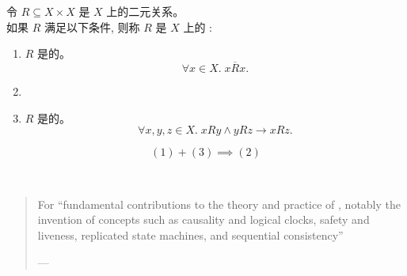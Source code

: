 \begin{frame}{}
  \begin{definition}
    令 $R \subseteq X \times X$ 是 $X$ 上的二元关系。\\[3pt]
    如果 $R$ 满足以下条件, 则称 $R$ 是 $X$ 上的 : \\[6pt]
    \begin{enumerate}[(1)]
      \setlength{\itemsep}{6pt}
      \item $R$ 是的。
        \[
          \forall x \in X.\; x \overline{R} x.
        \]
      \item {}
      \item $R$ 是的。
        \[
          \forall x, y, z \in X.\; x R y \land y R z \to x R z.
        \]
    \end{enumerate}
  \end{definition}

  \pause
  \vspace{-0.20cm}
  \[
    (1) + (3) \implies (2)
  \]
\end{frame}

\begin{frame}{}

  \begin{center}
     \\[3pt]
  \end{center}

  \begin{quote}
    For ``fundamental contributions to the theory and practice of
      ,
      notably the invention of concepts
      such as causality and logical clocks,
      safety and liveness, replicated state machines,
      and sequential consistency''

    \hfill  --- 
  \end{quote}
\end{frame}

\begin{frame}{}
  \begin{center}
  \end{center}
\end{frame}

